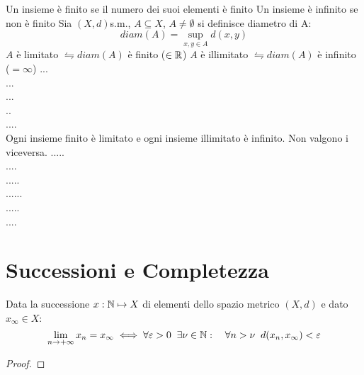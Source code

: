 Un insieme è finito se il numero dei suoi elementi è finito
Un insieme è infinito se non è finito
Sia $(X,d)$s.m., $A\subseteq X$, $A\ne \emptyset$ si definisce diametro di A: $$diam(A)=\sup\limits_{x,y\in A}d(x,y)$$
$A$ è limitato $\leftrightharpoons diam(A)$ è finito ($\in\mathbb{R}$)
$A$ è illimitato $\leftrightharpoons diam(A)$ è infinito ($=\infty$)
\example
...\\
...\\
...\\
..\\
....\\
\observation
Ogni insieme finito è limitato e ogni insieme illimitato è infinito. Non valgono i viceversa.
\example
.....\\
....\\
.....\\
......\\
.....\\
....\\


\section{Successioni e Completezza}
\begin{definition}
\end{definition}
\begin{definition}
\end{definition}
\begin{definition}
\end{definition}
\begin{proposition}
	\label{prop:succ_conv_lim}
	Data la successione $x: \mathbb{N} \mapsto X$ di elementi dello spazio metrico $(X,d)$ e dato $x_\infty\in X$:
	$$\lim\limits_{n\rightarrow+\infty}x_n=x_\infty\iff\forall\varepsilon > 0\;\;\exists\nu\in\mathbb{N}:\quad\forall n>\nu\;\;d(x_n,x_\infty)<\varepsilon$$
	\begin{proof}
	\end{proof}
\end{proposition}
